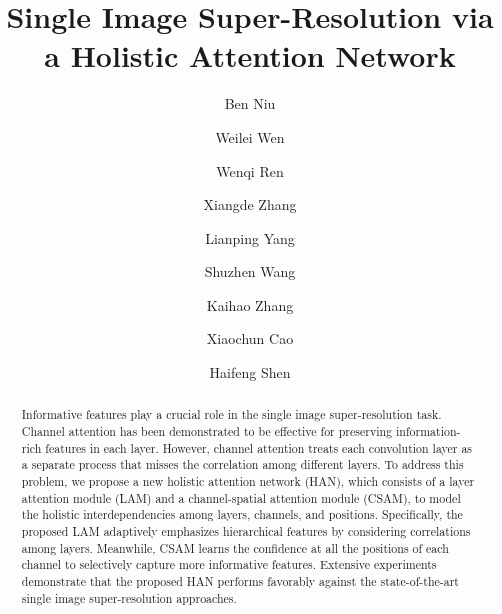 \documentclass[runningheads]{llncs}
\begin{document}
\pagestyle{headings}
\mainmatter
\def\ECCVSubNumber{1520}  

\title{ Single Image Super-Resolution via \\ a Holistic Attention Network}







\author{Ben Niu \and
	Weilei Wen \and
	Wenqi Ren \and
	Xiangde Zhang \and
	Lianping Yang \and
	Shuzhen Wang \and
	Kaihao Zhang \and
	Xiaochun Cao \and
	Haifeng Shen}


\renewcommand{\thefootnote}{\fnsymbol{footnote}}
\maketitle

\begin{abstract}
	Informative features play a crucial role in the single image super-resolution task. Channel attention has been demonstrated to be effective for preserving information-rich features in each layer.
However, channel attention treats each convolution layer as a separate process that misses the correlation among different layers. 
To address this problem, we propose a new holistic attention network (HAN), which consists of a layer attention module (LAM) and a channel-spatial attention module (CSAM), to model the holistic interdependencies among layers, channels, and positions.
Specifically, the proposed LAM adaptively emphasizes hierarchical features by considering correlations among layers.
Meanwhile, CSAM learns the confidence at all the positions of each channel to selectively capture more informative features.
Extensive experiments demonstrate that the proposed HAN performs favorably against the state-of-the-art single image super-resolution approaches.


\end{abstract}
\end{document}
